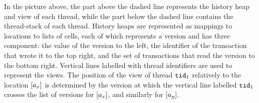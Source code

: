 \documentclass[a4paper,UKenglish]{article}%
\theoremstyle{plain}
\begin{document}
%
% 
%
% 
In the picture above, the part above the dashed line represents the history heap and 
view of each thread, while the part below the dashed line contains the thread-stack 
of each thread. History heaps are represented as mappings to locations to lists of cells, 
each of which represents a version and has three component: the value of the version 
to the left, the identifier of the transaction that wrote it to the top right, and the 
set of transactions that read the version to the bottom right. Vertical lines labelled 
with thread identifiers are used to represent the views. The position of the view of 
thread $\mathtt{tid}_1$ relatively to the location $[a_x]$ is determined by the version 
at which the vertical line labelled $\mathtt{tid}_1$ crosses the list of versions for $[a_x]$,
 and similarly for $[a_y]$.
\end{document}
